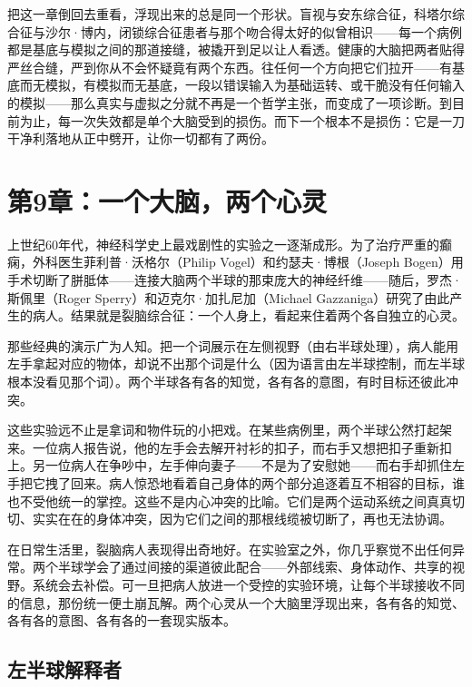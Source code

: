 \documentclass[11pt, twoside, openright]{book}
\begin{document}
把这一章倒回去重看，浮现出来的总是同一个形状。盲视与安东综合征，科塔尔综合征与沙尔·博内，闭锁综合征患者与那个吻合得太好的似曾相识------每一个病例都是基底与模拟之间的那道接缝，被撬开到足以让人看透。健康的大脑把两者贴得严丝合缝，严到你从不会怀疑竟有两个东西。往任何一个方向把它们拉开------有基底而无模拟，有模拟而无基底，一段以错误输入为基础运转、或干脆没有任何输入的模拟------那么真实与虚拟之分就不再是一个哲学主张，而变成了一项诊断。到目前为止，每一次失效都是单个大脑受到的损伤。而下一个根本不是损伤：它是一刀干净利落地从正中劈开，让你一切都有了两份。


\chapter*{第9章：一个大脑，两个心灵}

上世纪60年代，神经科学史上最戏剧性的实验之一逐渐成形。为了治疗严重的癫痫，外科医生菲利普·沃格尔（Philip Vogel）和约瑟夫·博根（Joseph Bogen）用手术切断了胼胝体------连接大脑两个半球的那束庞大的神经纤维------随后，罗杰·斯佩里（Roger Sperry）和迈克尔·加扎尼加（Michael Gazzaniga）研究了由此产生的病人。结果就是裂脑综合征：一个人身上，看起来住着两个各自独立的心灵。

那些经典的演示广为人知。把一个词展示在左侧视野（由右半球处理），病人能用左手拿起对应的物体，却说不出那个词是什么（因为语言由左半球控制，而左半球根本没看见那个词）。两个半球各有各的知觉，各有各的意图，有时目标还彼此冲突。

这些实验远不止是拿词和物件玩的小把戏。在某些病例里，两个半球公然打起架来。一位病人报告说，他的左手会去解开衬衫的扣子，而右手又想把扣子重新扣上。另一位病人在争吵中，左手伸向妻子------不是为了安慰她------而右手却抓住左手把它拽了回来。病人惊恐地看着自己身体的两个部分追逐着互不相容的目标，谁也不受他统一的掌控。这些不是内心冲突的比喻。它们是两个运动系统之间真真切切、实实在在的身体冲突，因为它们之间的那根线缆被切断了，再也无法协调。

在日常生活里，裂脑病人表现得出奇地好。在实验室之外，你几乎察觉不出任何异常。两个半球学会了通过间接的渠道彼此配合------外部线索、身体动作、共享的视野。系统会去补偿。可一旦把病人放进一个受控的实验环境，让每个半球接收不同的信息，那份统一便土崩瓦解。两个心灵从一个大脑里浮现出来，各有各的知觉、各有各的意图、各有各的一套现实版本。

\section*{左半球解释者}
\end{document}
